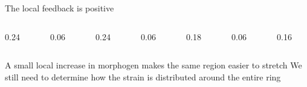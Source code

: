 \begin{frame}{The local feedback is positive}

  \vspace{0.35cm}

  \begin{columns}[c,onlytextwidth]
    \begin{column}{0.24\textwidth}
    \end{column}
    \begin{column}{0.06\textwidth}
      \centering{\color{HydraCyan}\fontsize{17}{17}\selectfont $\Rightarrow$}
    \end{column}
    \begin{column}{0.24\textwidth}
    \end{column}
    \begin{column}{0.06\textwidth}
      \centering{\color{HydraCyan}\fontsize{17}{17}\selectfont $\Rightarrow$}
    \end{column}
    \begin{column}{0.18\textwidth}
    \end{column}
    \begin{column}{0.06\textwidth}
      \centering{\color{HydraCyan}\fontsize{17}{17}\selectfont $\Rightarrow$}
    \end{column}
    \begin{column}{0.16\textwidth}
    \end{column}
  \end{columns}

  \vspace{0.70cm}

  \begin{center}
    \begin{minipage}{0.78\linewidth}
        {A small local increase in morphogen makes the same region easier to stretch}
      \vspace{-0.10cm}
        {We still need to determine how the strain is distributed around the entire ring}
    \end{minipage}
  \end{center}

\end{frame}


